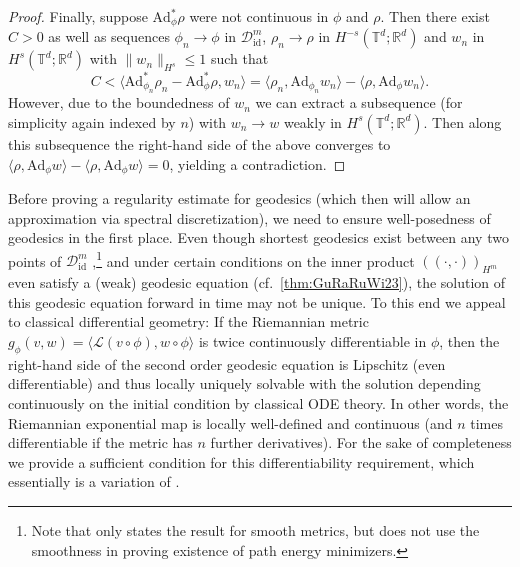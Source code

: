\documentclass[a4paper, 12pt]{article}
\newcommand{\R}{\mathbb{R}}
\newcommand{\T}{\mathbb{T}}
\newcommand{\id}{\mathrm{id}}
\newcommand{\DiffSobId}{\mathcal D_{\id}}
\renewcommand{\L}{\mathcal{L}}
\newcommand{\adjointMap}{\mathrm{Ad}}
\newcommand{\IPHm}[2]{(\!(#1,#2)\!)_{H^m}} %
\begin{document}
\begin{proof}
Finally, suppose $\adjointMap_\phi^*\rho$ were not continuous in $\phi$ and $\rho$.
Then there exist $C>0$ as well as sequences $\phi_n\to\phi$ in $\DiffSobId^m$, $\rho_n\to\rho$ in $H^{-s}(\T^d;\R^d)$ and  $w_n$ in $H^s(\T^d;\R^d)$ with $\|w_n\|_{H^s}\leq 1$ such that
\begin{equation*}
C
<\langle\adjointMap_{\phi_n}^*\rho_n-\adjointMap_{\phi}^*\rho,w_n\rangle
=\langle\rho_n,\adjointMap_{\phi_n}w_n\rangle-\langle\rho,\adjointMap_{\phi}w_n\rangle.
\end{equation*}
However, due to the boundedness of $w_n$ we can extract a subsequence (for simplicity again indexed by $n$) with $w_n\to w$ weakly in $H^s(\T^d;\R^d)$.
Then along this subsequence the right-hand side of the above converges to $\langle\rho,\adjointMap_{\phi}w\rangle-\langle\rho,\adjointMap_{\phi}w\rangle=0$, yielding a contradiction.
\end{proof}

Before proving a regularity estimate for geodesics (which then will allow an approximation via spectral discretization),
we need to ensure well-posedness of geodesics in the first place.
Even though shortest geodesics exist between any two points of $\DiffSobId^m$
\cite[Thm.\,3.7]{Tr95a},\cite[Thm.\,7.2]{BrVi17}\footnote{Note that \cite[Thm.\,7.2]{BrVi17} only states the result for smooth metrics,
but does not use the smoothness in proving existence of path energy minimizers.}
and under certain conditions on the inner product $\IPHm{\cdot}{\cdot}$ even satisfy a (weak) geodesic equation \cite{GuRaRuWi23} (cf.\ \cref{thm:GuRaRuWi23}),
the solution of this geodesic equation forward in time may not be unique.
To this end we appeal to classical differential geometry:
If the Riemannian metric $g_\phi(v,w)=\langle\L(v\circ\phi),w\circ\phi\rangle$ is twice continuously differentiable in $\phi$,
then the right-hand side of the second order geodesic equation is Lipschitz (even differentiable) and thus locally uniquely solvable \cite[\S\,1.6]{Kl95a}
with the solution depending continuously on the initial condition by classical ODE theory.
In other words, the Riemannian exponential map is locally well-defined and continuous (and $n$ times differentiable if the metric has $n$ further derivatives).
For the sake of completeness we provide a sufficient condition for this differentiability requirement, which essentially is a variation of \cite[Thm.\,4.1]{MiPr10}.
\end{document}
